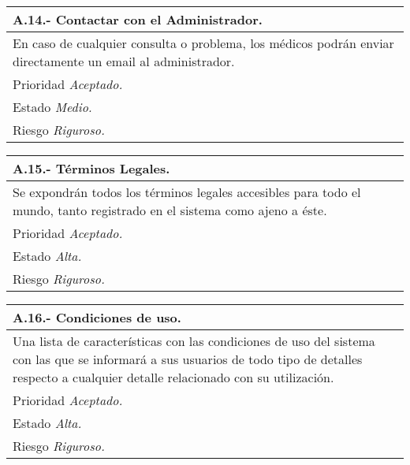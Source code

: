 	\begin{center}
	\begin{tabulary}{15cm}{|L|}
		\hline
			\bf{A.14.- Contactar con el Administrador.} \\
		\hline
			En caso de cualquier consulta o problema, los médicos podrán enviar directamente un email al administrador. \\
		\hline
			Prioridad \textit{Aceptado.} \\
		\hline
			Estado \textit{Medio.} \\
		\hline
			Riesgo \textit{Riguroso.} \\
		\hline
	\end{tabulary}
	\end{center}

	\begin{center}
	\begin{tabulary}{15cm}{|L|}
		\hline
			\bf{A.15.- Términos Legales.} \\
		\hline
			Se expondrán todos los términos legales accesibles para todo el mundo, tanto registrado en el sistema como ajeno a éste. \\
		\hline
			Prioridad \textit{Aceptado.} \\
		\hline
			Estado \textit{Alta.} \\
		\hline
			Riesgo \textit{Riguroso.} \\
		\hline
	\end{tabulary}
	\end{center}

	\begin{center}
	\begin{tabulary}{15cm}{|L|}
		\hline
			\bf{A.16.- Condiciones de uso.} \\
		\hline
			Una lista de características con las condiciones de uso del sistema con las que se informará a sus usuarios de todo tipo de detalles respecto a cualquier detalle relacionado con su utilización. \\
		\hline
			Prioridad \textit{Aceptado.} \\
		\hline
			Estado \textit{Alta.} \\
		\hline
			Riesgo \textit{Riguroso.} \\
		\hline
	\end{tabulary}
	\end{center}

